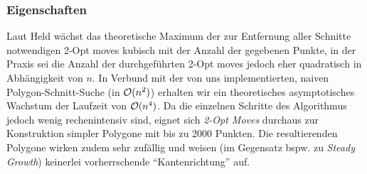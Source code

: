 \subsubsection{Eigenschaften}
Laut Held wächst das theoretische Maximum der zur Entfernung aller Schnitte notwendigen 2-Opt moves kubisch mit der Anzahl der gegebenen Punkte, in der Praxis sei die Anzahl der durchgeführten 2-Opt moves jedoch eher quadratisch in Abhängigkeit von $n$. In Verbund mit der von uns implementierten, naiven Polygon-Schnitt-Suche (in $\mathcal{O}(n^2)$) erhalten wir ein theoretisches asymptotisches Wachstum der Laufzeit von $\mathcal{O}(n^4)$. Da die einzelnen Schritte des Algorithmus jedoch wenig rechenintensiv sind, eignet sich \emph{2-Opt Moves} durchaus zur Konstruktion simpler Polygone mit bis zu 2000 Punkten. Die resultierenden Polygone wirken zudem sehr zufällig und weisen (im Gegensatz bspw. zu \emph{Steady Growth}) keinerlei vorherrschende \enquote{Kantenrichtung} auf.